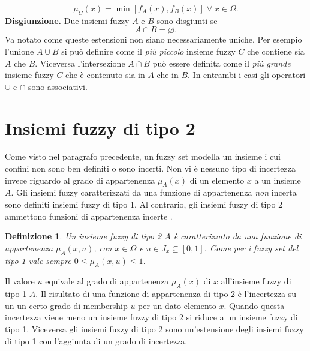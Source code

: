 \documentclass [11pt,a4paper,twoside,openright] {book}
\newtheorem{fuzzyset2}{Definizione}
\begin{document}
\begin{equation} \mu_C(x) = \min[f_A(x), f_B(x)] \; \forall \; x \in \Omega. \end{equation} 
\textbf{Disgiunzione.} Due insiemi fuzzy $A$ e $B$ sono disgiunti se
\begin{equation} A \cap B = \varnothing. \end{equation} 
Va notato come queste estensioni non siano necessariamente uniche. Per esempio l'unione $A \cup B$ si può definire come il \textit{più piccolo} insieme fuzzy $C$ che contiene sia $A$ che $B$. Viceversa l'intersezione $A \cap B$ può essere definita come il \textit{più grande} insieme fuzzy $C$ che è contenuto sia in $A$ che in $B$. In entrambi i casi gli operatori $\cup$ e $\cap$ sono associativi.
\section{Insiemi fuzzy di tipo 2}
Come visto nel paragrafo precedente, un fuzzy set modella un insieme i cui confini non sono ben definiti o sono incerti. Non vi è nessuno tipo di incertezza invece riguardo al grado di appartenenza $\mu_A(x)$ di un elemento $x$ a un insieme $A$. Gli insiemi fuzzy caratterizzati da una funzione di appartenenza \textit{non} incerta sono definiti insiemi fuzzy di tipo 1. Al contrario, gli insiemi fuzzy di tipo 2 ammettono funzioni di appartenenza incerte \cite{mendel2002type}.
\begin{fuzzyset2}
Un insieme fuzzy di tipo 2 $A$ è caratterizzato da una funzione di appartenenza $\mu_A(x,u)$, con $x \in \Omega$ e $u \in J_x \subseteq [0,1]$. Come per i fuzzy set del tipo 1 vale sempre $0 \leq \mu_A(x,u) \leq 1$.
\end{fuzzyset2}
Il valore $u$ equivale al grado di appartenenza $\mu_A(x)$ di $x$ all'insieme fuzzy di tipo 1 $A$. Il risultato di una funzione di appartenenza di tipo 2 è l'incertezza su un un certo grado di membership $u$ per un dato elemento $x$. Quando questa incertezza viene meno un insieme fuzzy di tipo 2 si riduce a un insieme fuzzy di tipo 1. Viceversa gli insiemi fuzzy di tipo 2 sono un'estensione degli insiemi fuzzy di tipo 1 con l'aggiunta di un grado di incertezza.
\end{document}
